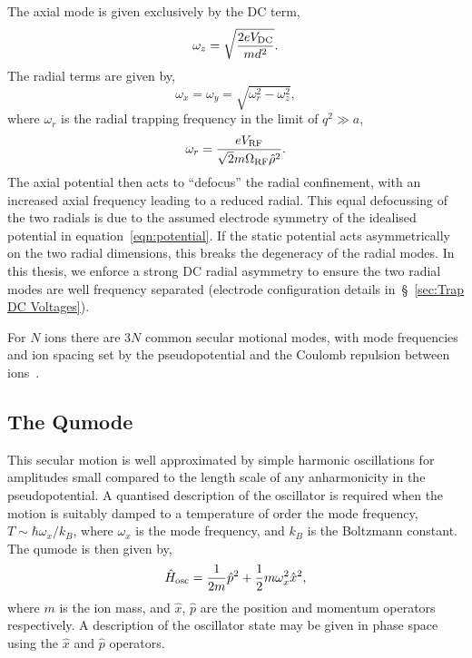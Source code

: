 The axial mode is given exclusively by the DC term,
\begin{equation}
    \omega_{z} = \sqrt{\frac{2eV_{\rm DC}}{md^2}}.
\end{equation}
The radial terms are given by,
\begin{equation}
    \label{eqn:pseudo_pot}
    \omega_{x} = \omega_{y}  = \sqrt{\omega_r^2 - \omega_z^2},
\end{equation}
where $\omega_r$ is the radial trapping frequency in the limit of $q^2\gg a$, 
\begin{equation}
    \omega_{r} = \frac{eV_{\rm RF}}{\sqrt{2}m\Omega_{\rm RF}\hat\rho^2}.
\end{equation}
The axial potential then acts to ``defocus'' the radial confinement, with an
increased axial frequency leading to a reduced radial. This equal defocussing of
the two radials is due to the assumed electrode symmetry of the idealised
potential in equation~\ref{eqn:potential}. If the static potential acts
asymmetrically on the two radial dimensions, this breaks the degeneracy of the
radial modes. In this thesis, we enforce a strong DC radial asymmetry to ensure
the two radial modes are well frequency separated (electrode configuration
details in~\S~\ref{sec:Trap DC Voltages}).

For $N$ ions there are $3N$ common secular motional modes, with mode frequencies
and ion spacing set by the pseudopotential and the Coulomb repulsion between
ions~\cite{james_quantum_1998}.

\subsection{The Qumode}
\label{sec:qumode}

This secular motion is well approximated by simple harmonic oscillations for amplitudes small compared to the length scale of any anharmonicity in the pseudopotential. 
A quantised description of the oscillator is required when the motion is suitably damped to a temperature of order the mode frequency, $T\sim \hbar \omega_x/k_B$, where $\omega_x$ is the mode frequency, and $k_B$ is the Boltzmann constant.
The qumode is then given by,
\begin{equation}
    \hat H_{\rm osc} = \frac{1}{2m}\hat p^2 + \frac{1}{2}m\omega_x^2\hat x^2,
\end{equation}
where $m$ is the ion mass, and $\hat x$, $\hat p$ are the position and momentum operators respectively. A description of the oscillator state may be given in phase space using the $\hat x$ and $\hat p$ operators.

